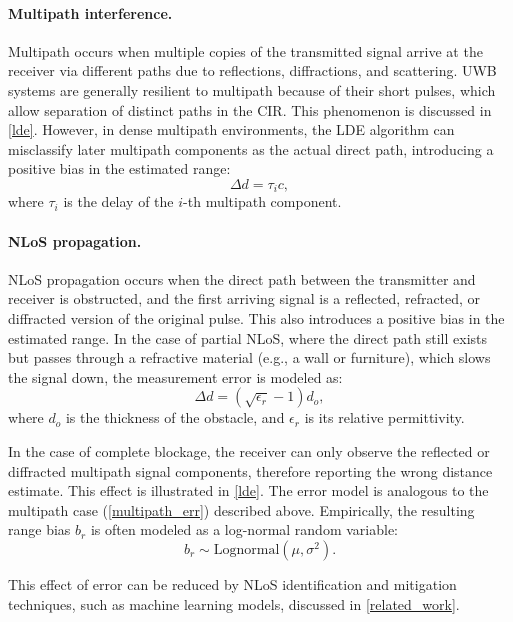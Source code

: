 \paragraph{Multipath interference.}
Multipath occurs when multiple copies of the transmitted signal arrive at the receiver via different paths due to reflections, diffractions, and scattering. UWB systems are generally resilient to multipath because of their short pulses, which allow separation of distinct paths in the CIR. This phenomenon is discussed in \autoref{lde}. However, in dense multipath environments, the LDE algorithm can misclassify later multipath components as the actual direct path, introducing a positive bias in the estimated range:
\begin{equation}\label{multipath_err}
    \Delta d = \tau_i c,
\end{equation}
where $\tau_i$ is the delay of the $i$-th multipath component.

\paragraph{NLoS propagation.}
NLoS propagation occurs when the direct path between the transmitter and receiver is obstructed, and the first arriving signal is a reflected, refracted, or diffracted version of the original pulse. This also introduces a positive bias in the estimated range. In the case of partial NLoS, where the direct path still exists but passes through a refractive material (e.g., a wall or furniture), which slows the signal down, the measurement error is modeled as:
\begin{equation}
\Delta d = (\sqrt{\epsilon_r} - 1) d_o,
\end{equation}
where $d_o$ is the thickness of the obstacle, and $\epsilon_r$ is its relative permittivity.

In the case of complete blockage, the receiver can only observe the reflected or diffracted multipath signal components, therefore reporting the wrong distance estimate. This effect is illustrated in \autoref{lde}. The error model is analogous to the multipath case (\autoref{multipath_err}) described above. Empirically, the resulting range bias $b_r$ is often modeled as a log-normal random variable:
\begin{equation}
b_r \sim \text{Lognormal}(\mu, \sigma^2).
\end{equation}

This effect of error can be reduced by NLoS identification and mitigation techniques, such as machine learning models, discussed in \autoref{related_work}.

